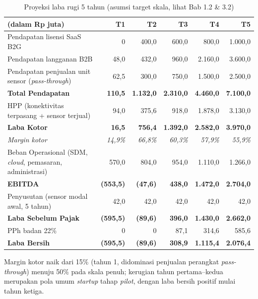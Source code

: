 \begin{table}[H]
\footnotesize
\renewcommand{\arraystretch}{0.85}
\begin{tabularx}{\textwidth}{|X|r|r|r|r|r|}
\hline
\textbf{(dalam Rp juta)} & \textbf{T1} & \textbf{T2} & \textbf{T3} & \textbf{T4} & \textbf{T5} \\
\hline
Pendapatan lisensi SaaS B2G & 0 & 400,0 & 600,0 & 800,0 & 1.000,0 \\
Pendapatan langganan B2B & 48,0 & 432,0 & 960,0 & 2.160,0 & 3.600,0 \\
Pendapatan penjualan unit sensor (\textit{pass-through}) & 62,5 & 300,0 & 750,0 & 1.500,0 & 2.500,0 \\
\hline
\textbf{Total Pendapatan} & \textbf{110,5} & \textbf{1.132,0} & \textbf{2.310,0} & \textbf{4.460,0} & \textbf{7.100,0} \\
\hline
HPP (konektivitas terpasang + sensor terjual) & 94,0 & 375,6 & 918,0 & 1.878,0 & 3.130,0 \\
\hline
\textbf{Laba Kotor} & \textbf{16,5} & \textbf{756,4} & \textbf{1.392,0} & \textbf{2.582,0} & \textbf{3.970,0} \\
\textit{Margin kotor} & \textit{14,9\%} & \textit{66,8\%} & \textit{60,3\%} & \textit{57,9\%} & \textit{55,9\%} \\
\hline
Beban Operasional (SDM, \textit{cloud}, pemasaran, administrasi) & 570,0 & 804,0 & 954,0 & 1.110,0 & 1.266,0 \\
\hline
\textbf{EBITDA} & \textbf{(553,5)} & \textbf{(47,6)} & \textbf{438,0} & \textbf{1.472,0} & \textbf{2.704,0} \\
\hline
Penyusutan (sensor modal awal, 5 tahun) & 42,0 & 42,0 & 42,0 & 42,0 & 42,0 \\
\hline
\textbf{Laba Sebelum Pajak} & \textbf{(595,5)} & \textbf{(89,6)} & \textbf{396,0} & \textbf{1.430,0} & \textbf{2.662,0} \\
PPh badan 22\% & 0 & 0 & 87,1 & 314,6 & 585,6 \\
\hline
\textbf{Laba Bersih} & \textbf{(595,5)} & \textbf{(89,6)} & \textbf{308,9} & \textbf{1.115,4} & \textbf{2.076,4} \\
\hline
\end{tabularx}
\caption{Proyeksi laba rugi 5 tahun (asumsi target skala, lihat Bab 1.2 \& 3.2)}
\end{table}

Margin kotor naik dari 15\% (tahun 1, didominasi penjualan perangkat \textit{pass-through}) menuju \textpm{}50\% pada skala penuh; kerugian tahun pertama--kedua merupakan pola umum \textit{startup} tahap \textit{pilot}, dengan laba bersih positif mulai tahun ketiga.

